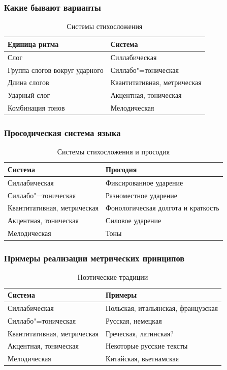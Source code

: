 \documentclass{beamer}
\begin{document}

\begin{frame}
\frametitle{Какие бывают варианты}

\begin{table}[]
\centering
\caption{Системы стихосложения}
\label{my-label}
\begin{tabular}{ll}
\hline
Единица ритма & Система \\ \hline
Слог & Силлабическая \\
Группа слогов вокруг ударного &  Силлабо"=тоническая \\
Длина слогов & Квантитативная, метрическая \\ 
Ударный слог & Акцентная, тоническая \\
Комбинация тонов & Мелодическая          
\end{tabular}
\end{table}

\end{frame}

\begin{frame}
\frametitle{Просодическая система языка}

\begin{table}[]
\centering
\caption{Системы стихосложения и просодия}
\label{my-label}
\begin{tabular}{ll}
\hline
Система & Просодия\\ \hline
Силлабическая & Фиксированное ударение  \\
Силлабо"=тоническая & Разноместное ударение  \\
Квантитативная, метрическая & Фонологическая долгота и краткость\\ 
Акцентная, тоническая & Силовое ударение \\
Мелодическая & Тоны          
\end{tabular}
\end{table}

\end{frame}

\begin{frame}
\frametitle{Примеры реализации метрических принципов}

\begin{table}[]
\centering
\caption{Поэтические традиции}
\label{my-label}
\begin{tabular}{ll}
\hline
Система & Примеры \\ \hline
Силлабическая & Польская, итальянская, французская  \\
Силлабо"=тоническая & Русская, немецкая  \\
Квантитативная, метрическая & Греческая, латинская?\\ 
Акцентная, тоническая  & Некоторые русские тексты \\
Мелодическая & Китайская, вьетнамская 
\end{tabular}
\end{table}

\end{frame}
\end{document}
